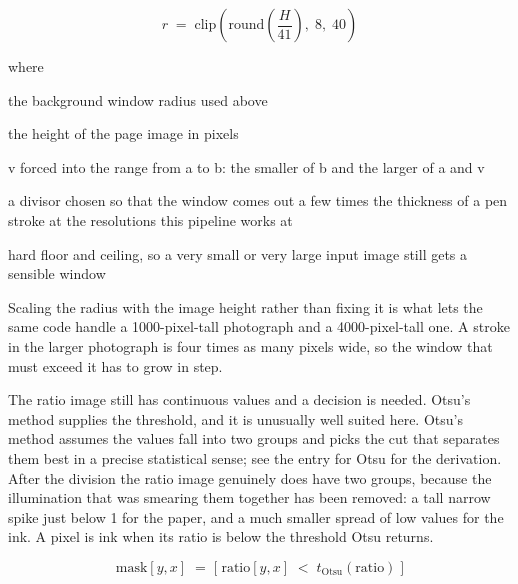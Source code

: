 \begin{equation}
r \;=\; \mathrm{clip}\!\left(\mathrm{round}\!\left(\frac{H}{41}\right),\; 8,\; 40\right)
\end{equation}

\noindent where
\begin{description}[leftmargin=2.4em,style=nextline,font=\normalfont\ttfamily]\setlength\itemsep{1pt}
  \item[{$r$}] \normalfont the background window radius used above
  \item[{$H$}] \normalfont the height of the page image in pixels
  \item[{$\mathrm{clip}(v,a,b)$}] \normalfont v forced into the range from a to b: the smaller of b and the larger of a and v
  \item[{$41$}] \normalfont a divisor chosen so that the window comes out a few times the thickness of a pen stroke at the resolutions this pipeline works at
  \item[{$8,\;40$}] \normalfont hard floor and ceiling, so a very small or very large input image still gets a sensible window
\end{description}
Scaling the radius with the image height rather than fixing it is what lets the same code handle a 1000-pixel-tall photograph and a 4000-pixel-tall one. A stroke in the larger photograph is four times as many pixels wide, so the window that must exceed it has to grow in step.


The ratio image still has continuous values and a decision is needed. Otsu's method supplies the threshold, and it is unusually well suited here. Otsu's method assumes the values fall into two groups and picks the cut that separates them best in a precise statistical sense; see the entry for Otsu for the derivation. After the division the ratio image genuinely does have two groups, because the illumination that was smearing them together has been removed: a tall narrow spike just below 1 for the paper, and a much smaller spread of low values for the ink. A pixel is ink when its ratio is below the threshold Otsu returns.


\begin{equation}
\mathrm{mask}[y,x] \;=\; \big[\;\mathrm{ratio}[y,x] \;<\; t_{\mathrm{Otsu}}(\mathrm{ratio})\;\big]
\end{equation}


